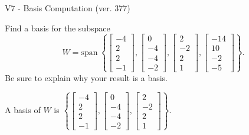 \begin{exercise}
  \begin{exerciseTitle}V7 - Basis Computation (ver. 377)\end{exerciseTitle}
  \begin{exerciseStatement}
    Find a basis for the subspace 
\[W=\mathrm{span}\ \left\{\left[\begin{array}{r}
-4 \\
2 \\
2 \\
-1
\end{array}\right] , \left[\begin{array}{r}
0 \\
-4 \\
-4 \\
-2
\end{array}\right] , \left[\begin{array}{r}
2 \\
-2 \\
2 \\
1
\end{array}\right] , \left[\begin{array}{r}
-14 \\
10 \\
-2 \\
-5
\end{array}\right]\right\}.\]
 Be sure to explain why your result is a basis.


  \end{exerciseStatement}
  \begin{exerciseAnswer}
   A basis of \(W\) is  \(\left\{\left[\begin{array}{r}
-4 \\
2 \\
2 \\
-1
\end{array}\right] , \left[\begin{array}{r}
0 \\
-4 \\
-4 \\
-2
\end{array}\right] , \left[\begin{array}{r}
2 \\
-2 \\
2 \\
1
\end{array}\right]\right\}\).
  


  \end{exerciseAnswer}
\end{exercise}